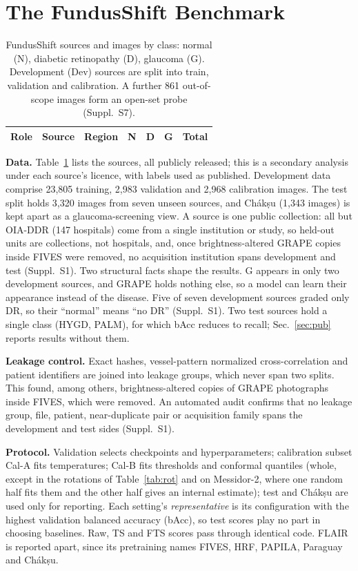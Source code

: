 \documentclass[runningheads]{llncs}
\newcommand{\sups}[1]{Suppl.~S#1}
\begin{document}
\section{The FundusShift Benchmark}\label{sec:bench}
\begin{table}[tb]
\caption{FundusShift sources and images by class: normal (N), diabetic retinopathy (D), glaucoma (G). Development (Dev) sources are split into train, validation and calibration. A further 861 out-of-scope images form an open-set probe (\sups{7}).}\label{tab:data}
\centering\scriptsize\setlength{\tabcolsep}{4pt}
\begin{tabular}{@{}lllrrrr@{}}
\toprule
Role & Source & Region & N & D & G & Total\\
\midrule

\end{tabular}
\end{table}

\textbf{Data.} Table~\ref{tab:data} lists the sources, all publicly released; this is a secondary analysis under each source's licence, with labels used as published. Development data comprise 23,805 training, 2,983 validation and 2,968 calibration images. The test split holds 3,320 images from seven unseen sources, and Ch\'ak\d{s}u (1,343 images) is kept apart as a glaucoma-screening view. A source is one public collection: all but OIA-DDR (147 hospitals) come from a single institution or study, so held-out units are collections, not hospitals, and, once brightness-altered GRAPE copies inside FIVES were removed, no acquisition institution spans development and test (\sups{1}). Two structural facts shape the results. G appears in only two development sources, and GRAPE holds nothing else, so a model can learn their appearance instead of the disease. Five of seven development sources graded only DR, so their ``normal'' means ``no DR'' (\sups{1}). Two test sources hold a single class (HYGD, PALM), for which bAcc reduces to recall; Sec.~\ref{sec:pub} reports results without them.

\textbf{Leakage control.} Exact hashes, vessel-pattern normalized cross-correlation and patient identifiers are joined into leakage groups, which never span two splits. This found, among others, brightness-altered copies of GRAPE photographs inside FIVES, which were removed. An automated audit confirms that no leakage group, file, patient, near-duplicate pair or acquisition family spans the development and test sides (\sups{1}).

\textbf{Protocol.} Validation selects checkpoints and hyperparameters; calibration subset Cal-A fits temperatures; Cal-B fits thresholds and conformal quantiles (whole, except in the rotations of Table~\ref{tab:rot} and on Messidor-2, where one random half fits them and the other half gives an internal estimate); test and Ch\'ak\d{s}u are used only for reporting. Each setting's \emph{representative} is its configuration with the highest validation balanced accuracy (bAcc), so test scores play no part in choosing baselines. Raw, TS and FTS scores pass through identical code. FLAIR is reported apart, since its pretraining names FIVES, HRF, PAPILA, Paraguay and Ch\'ak\d{s}u.
\end{document}
